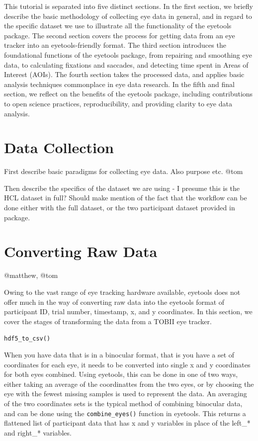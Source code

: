\documentclass[
  man,
  floatsintext,
  longtable,
  nolmodern,
  notxfonts,
  notimes,
  colorlinks=true,linkcolor=blue,citecolor=blue,urlcolor=blue]{apa7}
\begin{document}
This tutorial is separated into five distinct sections. In the first
section, we briefly describe the basic methodology of collecting eye
data in general, and in regard to the specific dataset we use to
illustrate all the functionality of the eyetools package. The second
section covers the process for getting data from an eye tracker into an
eyetools-friendly format. The third section introduces the foundational
functions of the eyetools package, from repairing and smoothing eye
data, to calculating fixations and saccades, and detecting time spent in
Areas of Interest (AOIs). The fourth section takes the processed data,
and applies basic analysis techniques commonplace in eye data research.
In the fifth and final section, we reflect on the benefits of the
eyetools package, including contributions to open science practices,
reproducibility, and providing clarity to eye data analysis.

\section{Data Collection}\label{data-collection}

First describe basic paradigms for collecting eye data. Also purpose
etc. @tom

Then describe the specifics of the dataset we are using - I presume this
is the HCL dataset in full? Should make mention of the fact that the
workflow can be done either with the full dataset, or the two
participant dataset provided in package.

\section{Converting Raw Data}\label{converting-raw-data}

@matthew, @tom

Owing to the vast range of eye tracking hardware available, eyetools
does not offer much in the way of converting raw data into the eyetools
format of participant ID, trial number, timestamp, x, and y coordinates.
In this section, we cover the stages of transforming the data from a
TOBII eye tracker.

\texttt{hdf5\_to\_csv()}

When you have data that is in a binocular format, that is you have a set
of coordinates for each eye, it needs to be converted into single x and
y coordinates for both eyes combined. Using eyetools, this can be done
in one of two ways, either taking an average of the coordinattes from
the two eyes, or by choosing the eye with the fewest missing samples is
used to represent the data. An averaging of the two coordinates sets is
the typical method of combining binocular data, and can be done using
the \texttt{combine\_eyes()} function in eyetools. This returns a
flattened list of participant data that has x and y variables in place
of the left\_* and right\_* variables.
\end{document}
